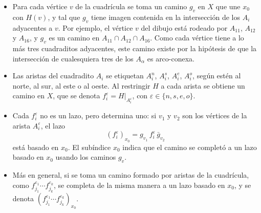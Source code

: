 \documentclass[11pt]{article}
\begin{document}
\begin{itemize}
  \item Para cada vértice $v$ de la cuadrícula se toma un camino $g_v$ en $X$ que une $x_0$ con $H(v)$, y tal que $g_v$ tiene imagen contenida en la intersección de los $A_i$ adyacentes a $v$. Por ejemplo, el vértice $v$ del dibujo está rodeado por $A_{11}$, $A_{12}$ y $A_{16}$, y $g_v$ es un camino en $A_{11}\cap A_{12}\cap A_{16}$. Como cada vértice tiene a lo más tres cuadraditos adyacentes, este camino existe por la hipótesis de que la intersección de cualesquiera tres de los $A_\alpha$ es arco-conexa.
  \item Las aristas del cuadradito $A_i$ se etiquetan $A_i^n$, $A_i^s$, $A_i^e$, $A_i^o$, según estén al norte, al sur, al este o al oeste. Al restringir $H$ a cada arista se obtiene un camino en $X$, que se denota $f_i^\varepsilon=H|_{A_i^\varepsilon}$, con $\varepsilon\in\{n,s,e,o\}$.
  \item Cada $f_i^\varepsilon$ no es un lazo, pero determina uno: si $v_1$ y $v_2$ son los vértices de la arista $A_i^\varepsilon$, el lazo
  \[
    (f_i^\varepsilon)_{x_0}=g_{v_1}\,f_i^\varepsilon\,\bar g_{v_2}
  \]
  está basado en $x_0$. El subíndice $x_0$ indica que el camino se completó a un lazo basado en $x_0$ usando los caminos $g_v$.
  \item Más en general, si se toma un camino formado por aristas de la cuadrícula, como $f_{j_1}^{\varepsilon_1}\cdots f_{j_k}^{\varepsilon_k}$, se completa de la misma manera a un lazo basado en $x_0$, y se denota $(f_{j_1}^{\varepsilon_1}\cdots f_{j_k}^{\varepsilon_k})_{x_0}$.
\end{itemize}

\begin{center}
\end{center}
\end{document}
